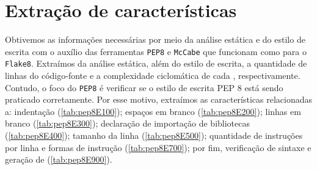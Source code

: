 	\section{Extração de características}
		Obtivemos as informações necessárias por meio da análise estática e do estilo de   %
		escrita com o auxílio das ferramentas \texttt{PEP8} \cite{pep8} e \texttt{McCabe}
		\cite{mccabe} que funcionam como  para o \texttt{Flake8}.
		Extraímos da análise estática, além do estilo de escrita, a quantidade de linhas do código-fonte e a %
		complexidade ciclomática de cada , respectivamente. Contudo, o
		foco do \texttt{PEP8} é verificar se o estilo de escrita PEP 8 \cite{van2001pep}
		está sendo praticado corretamente. Por esse motivo, extraímos as características
		relacionadas a: indentação (\cref{tab:pep8E100}); espaços em branco
		(\cref{tab:pep8E200}); linhas em branco (\cref{tab:pep8E300}); declaração de
		importação de bibliotecas (\cref{tab:pep8E400}); tamanho da linha (\cref{tab:pep8E500});
		quantidade de instruções por linha e formas de instrução (\cref{tab:pep8E700}); por fim,
		verificação de sintaxe e geração de  (\cref{tab:pep8E900}).
	
